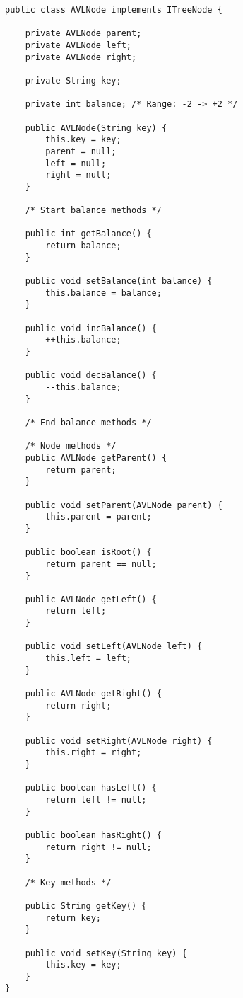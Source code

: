 \begin{lstlisting}[caption=AVLTree classes Source code - AVLNode]
public class AVLNode implements ITreeNode {

	private AVLNode parent;
	private AVLNode left;
	private AVLNode right;

	private String key;

	private int balance; /* Range: -2 -> +2 */

	public AVLNode(String key) {
		this.key = key;
		parent = null;
		left = null;
		right = null;
	}

	/* Start balance methods */
	
	public int getBalance() {
		return balance;
	}

	public void setBalance(int balance) {
		this.balance = balance;
	}

	public void incBalance() {
		++this.balance;
	}

	public void decBalance() {
		--this.balance;
	}

	/* End balance methods */

	/* Node methods */
	public AVLNode getParent() {
		return parent;
	}

	public void setParent(AVLNode parent) {
		this.parent = parent;
	}
	
	public boolean isRoot() {
		return parent == null;
	}
	
	public AVLNode getLeft() {
		return left;
	}

	public void setLeft(AVLNode left) {
		this.left = left;
	}

	public AVLNode getRight() {
		return right;
	}

	public void setRight(AVLNode right) {
		this.right = right;
	}

	public boolean hasLeft() {
		return left != null;
	}

	public boolean hasRight() {
		return right != null;
	}

	/* Key methods */

	public String getKey() {
		return key;
	}

	public void setKey(String key) {
		this.key = key;
	}
}
\end{lstlisting}